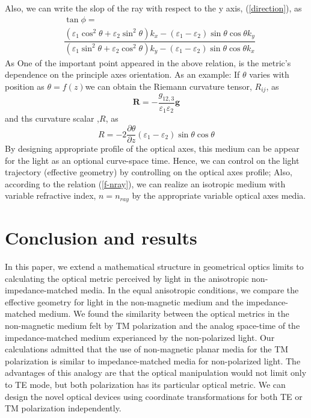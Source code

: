 \documentclass[9pt,twocolumn,twoside]{osajnl}
\begin{document}
Also, we can write the slop of the ray with respect to the y axis, (\ref{direction}), as
\begin{equation}
\begin{split}
&\tan{\phi}=\\
&\dfrac{\left(\varepsilon_{1} \cos^{2}{\theta} + \varepsilon_{2}\sin^{2}{\theta}\right)k_{x}-(\varepsilon_{1}-\varepsilon_{2})\sin{\theta} \cos{\theta}k_{y}}{(\varepsilon_{1} \sin^{2}{\theta} +\varepsilon_{2}\cos^{2}{\theta})k_{y}-(\varepsilon_{1}-\varepsilon_{2})\sin{\theta} \cos{\theta}k_{x}}
\end{split}
\end{equation}
As One of the important point appeared in the above relation, is the metric's dependence  on the principle axes orientation.  As an example: If $\theta$ varies with position as $\theta=f(z)$we can obtain the Riemann curvature tensor, $R_{ij}$, as 
\begin{equation}
\mathbf{R}=-\dfrac{g_{12,3}}{\varepsilon_{1}\varepsilon_{2}}\mathbf{g}
\end{equation}
and ths curvature scalar ,$R$, as
\begin{equation}
R=-2\dfrac{\partial{\theta}}{\partial{z}}(\varepsilon_{1}-\varepsilon_{2})\sin{\theta} \cos{\theta}
\end{equation}
 By designing appropriate profile of the optical axes, this medium can be appear for the light as an optional curve-space time. Hence, we can control on the light trajectory (effective geometry) by controlling on the optical axes profile; Also, according to the relation (\ref{f-nray}), we can realize an isotropic medium with variable refractive index, $n=n_{ray}$ by the appropriate variable optical axes media.

\section{Conclusion and results}
In this paper, we extend a mathematical structure in geometrical optics limits to calculating the optical metric perceived by light in the anisotropic non-impedance-matched media. 
In the equal anisotropic conditions, we compare the effective geometry for light in the non-magnetic medium and the impedance-matched medium. We found the similarity between the optical metrics in the non-magnetic medium felt by TM polarization and the analog space-time of the impedance-matched medium experianced by the non-polarized light. 
Our calculations admitted that the use of non-magnetic planar media for the TM polarization is similar to impedance-matched media for non-polarized light. 
The advantages of this analogy are that the optical manipulation would not limit only to TE mode, but both polarization has its particular optical metric. We can design the novel optical devices using coordinate transformations for both TE or TM polarization independently. 
\end{document}
